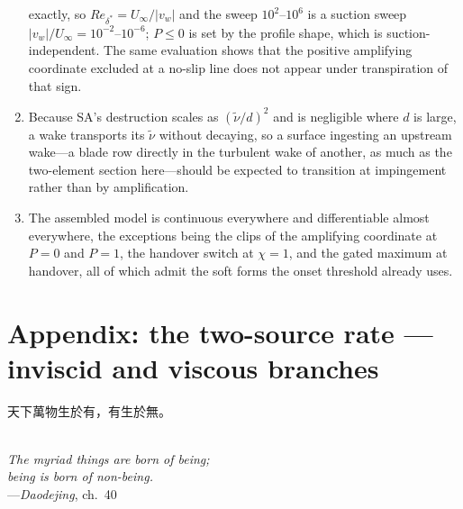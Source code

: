 \documentclass[10pt]{article}
\begin{document}
\begin{enumerate}
  exactly, so $Re_{\delta^*}\!=\!U_\infty/|v_w|$ and the sweep
  $10^2$--$10^6$ is a suction sweep $|v_w|/U_\infty\!=\!10^{-2}$--$10^{-6}$;
  $P\!\le\!0$ is set by the profile shape, which is suction-independent.
  The same evaluation shows that the positive amplifying coordinate excluded
  at a no-slip line does not appear under transpiration of that sign.
\item Because SA's destruction scales as $(\tilde\nu/d)^2$ and is
  negligible where $d$ is large, a wake transports its $\tilde\nu$ without
  decaying, so a surface ingesting an upstream wake---a blade row directly
  in the turbulent wake of another, as much as the two-element section
  here---should be expected to
  transition at impingement rather than by amplification.
\item The assembled model is continuous everywhere and differentiable
  almost everywhere, the exceptions being the clips of the amplifying
  coordinate at $P\!=\!0$ and $P\!=\!1$, the handover switch at
  $\chi\!=\!1$, and the gated maximum at handover, all of which admit the
  soft forms the onset threshold already uses.
\end{enumerate}

\clearpage

\appendix

\section{Appendix: the two-source rate --- inviscid and viscous branches}
\label{app:twosource}




\clearpage
\thispagestyle{empty}
\vspace*{\fill}
\begin{center}
  \begin{minipage}{0.6\textwidth}\centering
  \begin{CJK}{UTF8}{bsmi}天下萬物生於有，有生於無。\end{CJK}\\[6pt]
  \emph{The myriad things are born of being;\\
  being is born of non-being.}\\[6pt]
  ---\emph{Daodejing}, ch.~40
  \end{minipage}
\end{center}
\vspace*{\fill}
\end{document}
